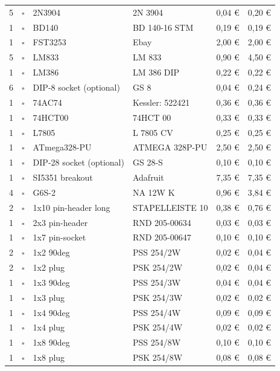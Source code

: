 \documentclass[10pt, a4paper,twoside,openright]{scrartcl}
\begin{document}
\begin{longtable}{|p{}|p{}|p{}|p{}|p{}|p{}|}
5 & $\square$ & 2N3904 & 2N 3904 & 0,04 \euro & 0,20 \euro \\
1 & $\square$ & BD140 & BD 140-16 STM & 0,19 \euro & 0,19 \euro \\
1 & $\square$ & FST3253 & Ebay & 2,00 \euro & 2,00 \euro \\
5 & $\square$ & LM833 & LM 833 & 0,90 \euro & 4,50 \euro \\
1 & $\square$ & LM386 & LM 386 DIP & 0,22 \euro & 0,22 \euro \\
6 & $\square$ & DIP-8 socket (optional) & GS 8 & 0,04 \euro & 0,24 \euro \\
1 & $\square$ & 74AC74 & Kessler: 522421 & 0,36 \euro & 0,36 \euro \\
1 & $\square$ & 74HCT00 & 74HCT 00 & 0,33 \euro & 0,33 \euro \\
1 & $\square$ & L7805 & L 7805 CV & 0,25 \euro & 0,25 \euro \\
1 & $\square$ & ATmega328-PU & ATMEGA 328P-PU & 2,50 \euro & 2,50 \euro \\
1 & $\square$ & DIP-28 socket (optional) & GS 28-S & 0,10 \euro & 0,10 \euro \\
1 & $\square$ & SI5351 breakout & Adafruit & 7,35 \euro & 7,35 \euro \\ \hline
4 & $\square$ & G6S-2 & NA 12W K & 0,96 \euro & 3,84 \euro \\ \hline
2 & $\square$ & 1x10 pin-header long & STAPELLEISTE 10 & 0,38 \euro & 0,76 \euro \\
1 & $\square$ & 2x3 pin-header & RND 205-00634 & 0,03 \euro & 0,03 \euro \\
1 & $\square$ & 1x7 pin-socket & RND 205-00647 & 0,10 \euro & 0,10 \euro \\
2 & $\square$ & 1x2 90deg & PSS 254/2W & 0,02 \euro & 0,04 \euro \\
2 & $\square$ & 1x2 plug & PSK 254/2W & 0,02 \euro & 0,04 \euro \\
1 & $\square$ & 1x3 90deg & PSS 254/3W & 0,04 \euro & 0,04 \euro \\
1 & $\square$ & 1x3 plug & PSK 254/3W & 0,02 \euro & 0,02 \euro \\
1 & $\square$ & 1x4 90deg & PSS 254/4W & 0,09 \euro & 0,09 \euro \\
1 & $\square$ & 1x4 plug & PSK 254/4W & 0,02 \euro & 0,02 \euro \\
1 & $\square$ & 1x8 90deg & PSS 254/8W & 0,10 \euro & 0,10 \euro \\
1 & $\square$ & 1x8 plug & PSK 254/8W & 0,08 \euro & 0,08 \euro \\

\end{longtable}
\end{document}

